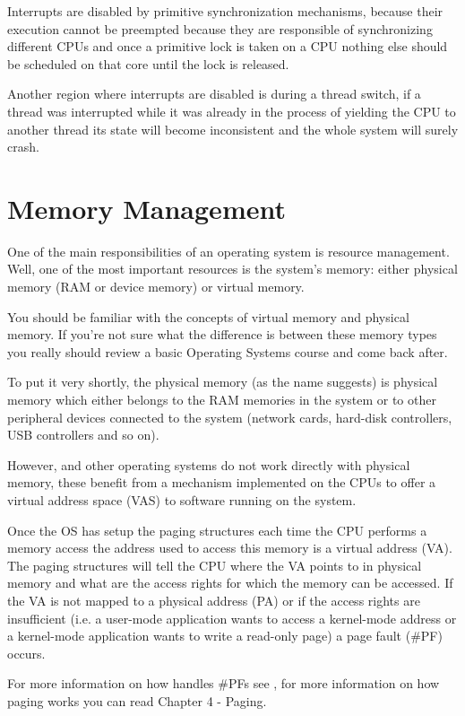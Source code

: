 \begin{appendices}
Interrupts are disabled by primitive synchronization mechanisms, because their execution cannot be
preempted because they are responsible of synchronizing different CPUs and once a primitive lock is
taken on a CPU nothing else should be scheduled on that core until the lock is released.

Another region where interrupts are disabled is during a thread switch, if a thread was interrupted
while it was already in the process of yielding the CPU to another thread its state will become
inconsistent and the whole system will surely crash.

\section{Memory Management}
\label{sect:MemManagement}

One of the main responsibilities of an operating system is resource management. Well, one of the
most important resources is the system's memory: either physical memory (RAM or device memory) or
virtual memory.

You should be familiar with the concepts of virtual memory and physical memory. If you're not sure
what the difference is between these memory types you really should review a basic Operating Systems
course and come back after.

To put it very shortly, the physical memory (as the name suggests) is physical memory which either
belongs to the RAM memories in the system or to other peripheral devices connected to the system
(network cards, hard-disk controllers, USB controllers and so on).

However, \projectname and other operating systems do not work directly with physical memory, these
benefit from a mechanism implemented on the CPUs to offer a virtual address space (VAS) to software
running on the system.

Once the OS has setup the paging structures each time the CPU performs a memory access the address
used to access this memory is a virtual address (VA). The paging structures will tell the CPU
where the VA points to in physical memory and what are the access rights for which the memory can
be accessed. If the VA is not mapped to a physical address (PA) or if the access rights are
insufficient (i.e. a user-mode application wants to access a kernel-mode address or a kernel-mode
application wants to write a read-only page) a page fault (\#PF) occurs.

For more information on how \projectname handles \#PFs see , for more
information on how paging works you can read \cite{intelSys} Chapter 4 - Paging.


\end{appendices}
